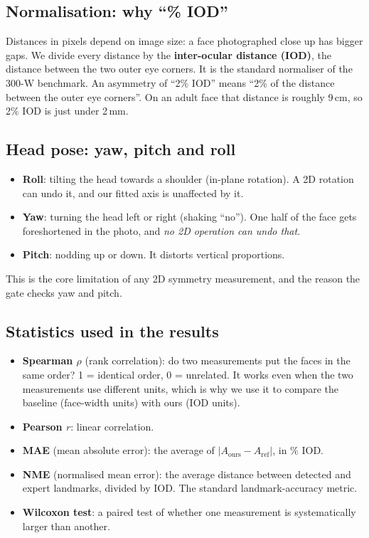 \subsection{Normalisation: why ``\% IOD''}
Distances in pixels depend on image size: a face photographed close up has bigger
gaps. We divide every distance by the \textbf{inter-ocular distance (IOD)}, the distance
between the two outer eye corners. It is the standard normaliser of the 300-W benchmark. An
asymmetry of ``2\% IOD'' means ``2\% of the distance between the outer eye corners''. On an adult face that distance is roughly 9\,cm, so
2\% IOD is just under 2\,mm.

\subsection{Head pose: yaw, pitch and roll}
\begin{itemize}
\item \textbf{Roll}: tilting the head towards a shoulder (in-plane rotation). A 2D rotation
can undo it, and our fitted axis is unaffected by it.
\item \textbf{Yaw}: turning the head left or right (shaking ``no''). One half of the face
gets foreshortened in the photo, and \emph{no 2D operation can undo that}.
\item \textbf{Pitch}: nodding up or down. It distorts vertical proportions.
\end{itemize}
This is the core limitation of any 2D symmetry measurement, and the reason the gate checks
yaw and pitch.

\subsection{Statistics used in the results}
\begin{itemize}
\item \textbf{Spearman $\rho$} (rank correlation): do two measurements put the faces in the
same order? 1 = identical order, 0 = unrelated. It works even when the two measurements use
different units, which is why we use it to compare the baseline (face-width units) with ours
(IOD units).
\item \textbf{Pearson $r$}: linear correlation.
\item \textbf{MAE} (mean absolute error): the average of $|A_{\text{ours}}-A_{\text{ref}}|$, in \% IOD.
\item \textbf{NME} (normalised mean error): the average distance between detected and
expert landmarks, divided by IOD. The standard landmark-accuracy metric.
\item \textbf{Wilcoxon test}: a paired test of whether one measurement is systematically
larger than another.
\end{itemize}

